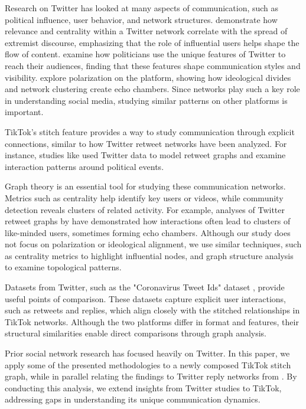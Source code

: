 Research on Twitter has looked at many aspects of communication, such as political influence, user behavior, and network structures. \citet{torregrosa2020analyzing} demonstrate how relevance and centrality within a Twitter network correlate with the spread of extremist discourse, emphasizing that the role of influential users helps shape the flow of content. \citet{lassen2011twitter} examine how politicians use the unique features of Twitter to reach their audiences, finding that these features shape communication styles and visibility. \citet{doi:10.1126/sciadv.abq2044} explore polarization on the platform, showing how ideological divides and network clustering create echo chambers. Since networks play such a key role in understanding social media, studying similar patterns on other platforms is important. 

TikTok’s stitch feature provides a way to study communication through explicit connections, similar to how Twitter retweet networks have been analyzed. For instance, studies like \cite{garimella2018political} used Twitter data to model retweet graphs and examine interaction patterns around political events. 

Graph theory is an essential tool for studying these communication networks. Metrics such as centrality help identify key users or videos, while community detection reveals clusters of related activity. For example, analyses of Twitter retweet graphs by \cite{doi:10.1073/pnas.2023301118} have demonstrated how interactions often lead to clusters of like-minded users, sometimes forming echo chambers. Although our study does not focus on polarization or ideological alignment, we use similar techniques, such as centrality metrics to highlight influential nodes, and graph structure analysis to examine topological patterns. 

Datasets from Twitter, such as the "Coronavirus Tweet Ids" dataset \citep{kerchner2020coronavirus}, provide useful points of comparison. These datasets capture explicit user interactions, such as retweets and replies, which align closely with the stitched relationships in TikTok networks. Although the two platforms differ in format and features, their structural similarities enable direct comparisons through graph analysis. 

Prior social network research has focused heavily on Twitter. In this paper, we apply some of the presented methodologies to a newly composed TikTok stitch graph, while in parallel relating the findings to Twitter reply networks from \cite{doi:10.1126/sciadv.abq2044}. By conducting this analysis, we extend insights from Twitter studies to TikTok, addressing gaps in understanding its unique communication dynamics. 